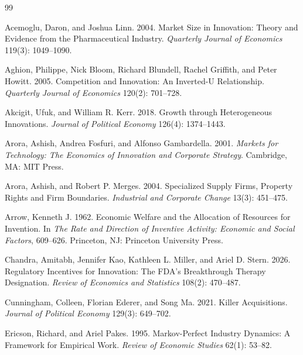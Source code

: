 \documentclass[12pt]{article}
\newcommand{\1}{\mathbf{1}}
\begin{document}
\begin{thebibliography}{99}

Acemoglu, Daron, and Joshua Linn. 2004.
\newblock Market Size in Innovation: Theory and Evidence from the Pharmaceutical Industry.
\newblock \emph{Quarterly Journal of Economics} 119(3): 1049--1090.

Aghion, Philippe, Nick Bloom, Richard Blundell, Rachel Griffith, and Peter Howitt. 2005.
\newblock Competition and Innovation: An Inverted-U Relationship.
\newblock \emph{Quarterly Journal of Economics} 120(2): 701--728.

Akcigit, Ufuk, and William R. Kerr. 2018.
\newblock Growth through Heterogeneous Innovations.
\newblock \emph{Journal of Political Economy} 126(4): 1374--1443.

Arora, Ashish, Andrea Fosfuri, and Alfonso Gambardella. 2001.
\newblock \emph{Markets for Technology: The Economics of Innovation and Corporate Strategy}.
\newblock Cambridge, MA: MIT Press.

Arora, Ashish, and Robert P. Merges. 2004.
\newblock Specialized Supply Firms, Property Rights and Firm Boundaries.
\newblock \emph{Industrial and Corporate Change} 13(3): 451--475.

Arrow, Kenneth J. 1962.
\newblock Economic Welfare and the Allocation of Resources for Invention.
\newblock In \emph{The Rate and Direction of Inventive Activity: Economic and Social Factors}, 609--626.
\newblock Princeton, NJ: Princeton University Press.

Chandra, Amitabh, Jennifer Kao, Kathleen L. Miller, and Ariel D. Stern. 2026.
\newblock Regulatory Incentives for Innovation: The FDA's Breakthrough Therapy Designation.
\newblock \emph{Review of Economics and Statistics} 108(2): 470--487.

Cunningham, Colleen, Florian Ederer, and Song Ma. 2021.
\newblock Killer Acquisitions.
\newblock \emph{Journal of Political Economy} 129(3): 649--702.

Ericson, Richard, and Ariel Pakes. 1995.
\newblock Markov-Perfect Industry Dynamics: A Framework for Empirical Work.
\newblock \emph{Review of Economic Studies} 62(1): 53--82.


\end{thebibliography}
\end{document}
